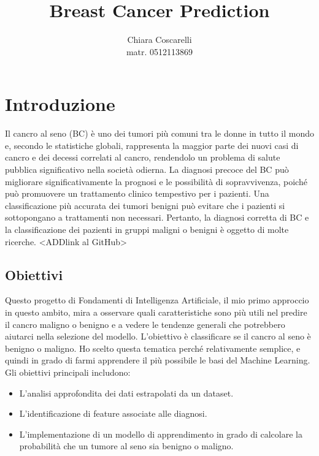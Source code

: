 \documentclass{article}
\title{Breast Cancer Prediction}
\author{Chiara Coscarelli\\[1ex]matr. 0512113869}
\begin{document}
\maketitle

\newpage
\tableofcontents
\newpage
\section{Introduzione}

Il cancro al seno (BC) è uno dei tumori più comuni tra le donne in tutto il mondo e, secondo le statistiche globali, rappresenta la maggior parte dei nuovi casi di cancro e dei decessi correlati al cancro, rendendolo un problema di salute pubblica significativo nella società odierna. La diagnosi precoce del BC può migliorare significativamente la prognosi e le possibilità di sopravvivenza, poiché può promuovere un trattamento clinico tempestivo per i pazienti. Una classificazione più accurata dei tumori benigni può evitare che i pazienti si sottopongano a trattamenti non necessari. Pertanto, la diagnosi corretta di BC e la classificazione dei pazienti in gruppi maligni o benigni è oggetto di molte ricerche.  <ADDlink al GitHub>


\subsection{Obiettivi}
Questo progetto di Fondamenti di Intelligenza Artificiale, il mio primo approccio in questo ambito, mira a osservare quali caratteristiche sono più utili nel predire il cancro maligno o benigno e a vedere le tendenze generali che potrebbero aiutarci nella selezione del modello. L’obiettivo è classificare se il cancro al seno è benigno o maligno. Ho scelto questa tematica perché relativamente semplice, e quindi in grado di farmi apprendere il più possibile le basi del Machine Learning.
Gli obiettivi principali includono:
\begin{itemize}
    \item L'analisi approfondita dei dati estrapolati da un dataset.
    \item L'identificazione di feature associate alle diagnosi.
    \item L'implementazione di un modello di apprendimento in grado di calcolare la probabilità che un tumore al seno sia benigno o maligno.
\end{itemize}
\end{document}

